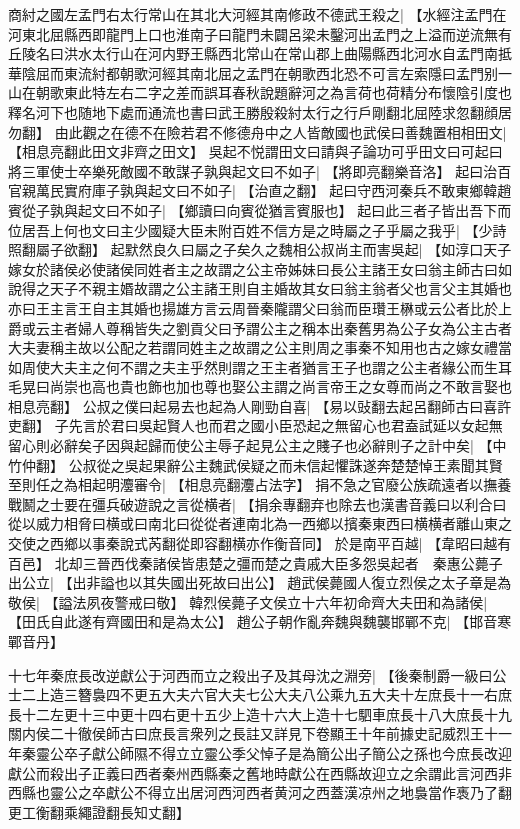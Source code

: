 商紂之國左孟門右太行常山在其北大河經其南修政不德武王殺之|{
	【水經注孟門在河東北屈縣西即龍門上口也淮南子曰龍門未闢呂梁未鑿河出孟門之上溢而逆流無有丘陵名曰洪水太行山在河内野王縣西北常山在常山郡上曲陽縣西北河水自孟門南抵華陰屈而東流紂都朝歌河經其南北屈之孟門在朝歌西北恐不可言左索隱曰孟門别一山在朝歌東此特左右二字之差而誤耳春秋說題辭河之為言荷也荷精分布懷陰引度也釋名河下也随地下處而通流也書曰武王勝殷殺紂太行之行戶剛翻北屈陸求忽翻顔居勿翻】}
由此觀之在德不在險若君不修德舟中之人皆敵國也武侯曰善魏置相相田文|{
	【相息亮翻此田文非齊之田文】}
吳起不悦謂田文曰請與子論功可乎田文曰可起曰將三軍使士卒樂死敵國不敢謀子孰與起文曰不如子|{
	【將即亮翻樂音洛】}
起曰治百官親萬民實府庫子孰與起文曰不如子|{
	【治直之翻】}
起曰守西河秦兵不敢東鄉韓趙賓從子孰與起文曰不如子|{
	【鄉讀曰向賓從猶言賓服也】}
起曰此三者子皆出吾下而位居吾上何也文曰主少國疑大臣未附百姓不信方是之時屬之子乎屬之我乎|{
	【少詩照翻屬子欲翻】}
起默然良久曰屬之子矣久之魏相公叔尚主而害吳起|{
	【如淳口天子嫁女於諸侯必使諸侯同姓者主之故謂之公主帝姊妹曰長公主諸王女曰翁主師古曰如說得之天子不親主㛰故謂之公主諸王則自主婚故其女曰翁主翁者父也言父主其婚也亦曰王主言王自主其婚也揚雄方言云周晉秦隴謂父曰翁而臣瓚王楙或云公者比於上爵或云主者婦人尊稱皆失之劉貢父曰予謂公主之稱本出秦舊男為公子女為公主古者大夫妻稱主故以公配之若謂同姓主之故謂之公主則周之事秦不知用也古之嫁女禮當如周使大夫主之何不謂之夫主乎然則謂之王主者猶言王子也謂之公主者緣公而生耳毛晃曰尚崇也高也貴也飾也加也尊也娶公主謂之尚言帝王之女尊而尚之不敢言娶也相息亮翻】}
公叔之僕曰起易去也起為人剛勁自喜|{
	【易以䜴翻去起呂翻師古曰喜許吏翻】}
子先言於君曰吳起賢人也而君之國小臣恐起之無留心也君盍試延以女起無留心則必辭矣子因與起歸而使公主辱子起見公主之賤子也必辭則子之計中矣|{
	【中竹仲翻】}
公叔從之吳起果辭公主魏武侯疑之而未信起懼誅遂奔楚楚悼王素聞其賢至則任之為相起明灋審令|{
	【相息亮翻灋占法字】}
捐不急之官廢公族疏遠者以撫養戰鬭之士要在彊兵破遊說之言從横者|{
	【捐余專翻弃也除去也漢書音義曰以利合曰從以威力相脅曰横或曰南北曰從從者連南北為一西鄉以擯秦東西曰横横者離山東之交使之西鄉以事秦說式芮翻從即容翻横亦作衡音同】}
於是南平百越|{
	【韋昭曰越有百邑】}
北却三晉西伐秦諸侯皆患楚之彊而楚之貴戚大臣多怨吳起者　秦惠公薨子出公立|{
	【出非謚也以其失國出死故曰出公】}
趙武侯薨國人復立烈侯之太子章是為敬侯|{
	【謚法夙夜警戒曰敬】}
韓烈侯薨子文侯立十六年初命齊大夫田和為諸侯|{
	【田氏自此遂有齊國田和是為太公】}
趙公子朝作亂奔魏與魏襲邯鄲不克|{
	【邯音寒鄲音丹】}
\par
十七年秦庶長改逆獻公于河西而立之殺出子及其母沈之淵旁|{
	【後秦制爵一級曰公士二上造三簪裊四不更五大夫六官大夫七公大夫八公乘九五大夫十左庶長十一右庶長十二左更十三中更十四右更十五少上造十六大上造十七駟車庶長十八大庶長十九關内侯二十徹侯師古曰庶長言衆列之長註又詳見下卷顯王十年前據史記威烈王十一年秦靈公卒子獻公師隰不得立立靈公季父悼子是為簡公出子簡公之孫也今庶長改迎獻公而殺出子正義曰西者秦州西縣秦之舊地時獻公在西縣故迎立之余謂此言河西非西縣也靈公之卒獻公不得立出居河西河西者黄河之西蓋漢凉州之地裊當作褭乃了翻更工衡翻乘繩證翻長知丈翻】}
